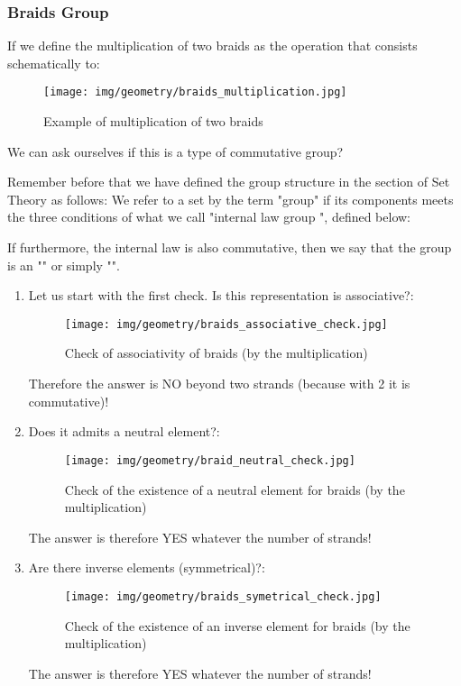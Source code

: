 {		\subsubsection{Braids Group}
		If we define the multiplication of two braids as the operation that consists schematically to:
		\begin{figure}[H]
			\centering
			\texttt{[image: img/geometry/braids\_multiplication.jpg]}
			\caption{Example of multiplication of two braids}
		\end{figure}
		We can ask ourselves if this is a type of commutative group?
		
		Remember before that we have defined the group structure in the section of Set Theory as follows: We refer to a set by the term "group" if its components meets the three conditions of what we call "internal law group ", defined below:
	
	If furthermore, the internal law is also commutative, then we say that the group is an "" or simply "".
	
	 \begin{enumerate}
	 	\item Let us start with the first check. Is this representation is associative?:
		\begin{figure}[H]
			\centering
			\texttt{[image: img/geometry/braids\_associative\_check.jpg]}
			\caption{Check of associativity of braids (by the multiplication)}
		\end{figure}
		Therefore the answer is NO beyond two strands (because with 2 it is commutative)!
		
		 \item Does it admits a neutral element?:
		 \begin{figure}[H]
			\centering
			\texttt{[image: img/geometry/braid\_neutral\_check.jpg]}
			\caption{Check of the existence of a neutral element for braids (by the multiplication)}
		\end{figure}
		The answer is therefore YES whatever the number of strands!
		
		\item Are there inverse elements (symmetrical)?:
		\begin{figure}[H]
			\centering
			\texttt{[image: img/geometry/braids\_symetrical\_check.jpg]}
			\caption{Check of the existence of an inverse element for braids (by the multiplication)}
		\end{figure}
		The answer is therefore YES whatever the number of strands!		
	 \end{enumerate}
	 
}
